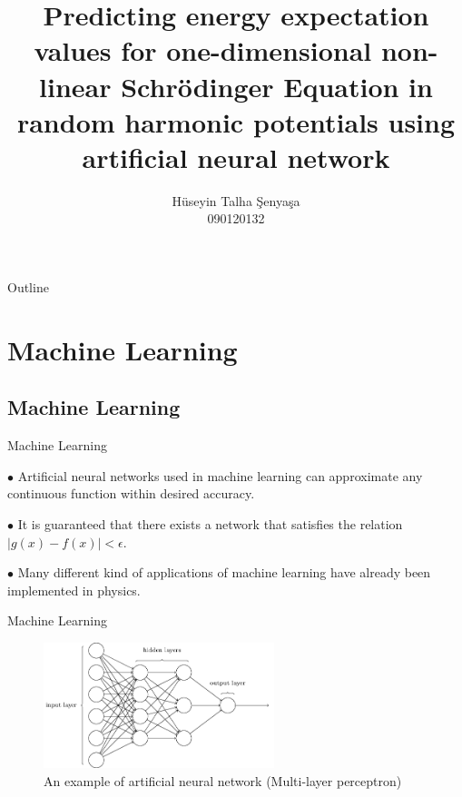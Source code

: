 \documentclass{beamer}
\title[Machine Learning and GPE]{Predicting energy expectation values for one-dimensional
non-linear Schrödinger Equation in random harmonic
potentials using artificial neural network}
\author{H{\"u}seyin Talha \c{S}enya\c{s}a\\090120132}
\institute{Advanced Physic Project Presentation}
\begin{document}
\begin{frame}
  \titlepage
\end{frame}

\begin{frame}{Outline}
  \tableofcontents
\end{frame}

\section{Machine Learning}

\subsection{Machine Learning}

\begin{frame}{Machine Learning}

$\bullet$ Artificial neural networks used in machine learning can approximate any continuous function within desired accuracy.

\vskip 1cm

$\bullet$ It is guaranteed that there exists
a network that satisfies the relation $|g(x) − f(x)| < \epsilon$.

\vskip 1cm

$\bullet$ Many different kind of applications of machine learning have already been implemented in physics.


\end{frame}


\begin{frame}{Machine Learning}

\begin{figure}[Htb!]
\includegraphics[width=0.6\textwidth]{neuralnetworkex.png}
\caption{\label{doppler_LP}An example of artificial neural network (Multi-layer perceptron)}
\end{figure}

\end{frame} 
\end{document}
